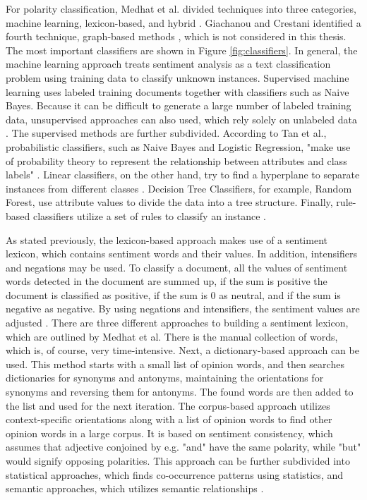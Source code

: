 For polarity classification, Medhat et al. divided techniques into three categories, machine learning, lexicon-based, and hybrid \cite{MEDHAT20141093}. Giachanou and Crestani identified a fourth technique, graph-based methods \cite{DBLP:journals/csur/GiachanouC16}, which is not considered in this thesis. The most important classifiers are shown in Figure \ref{fig:classifiers}. In general, the machine learning approach treats sentiment analysis as a text classification problem using training data to classify unknown instances. Supervised machine learning uses labeled training documents together with classifiers such as Naive Bayes. Because it can be difficult to generate a large number of labeled training data, unsupervised approaches can also used, which rely solely on unlabeled data \cite{MEDHAT20141093}. The supervised methods are further subdivided. According to Tan et al., probabilistic classifiers, such as Naive Bayes and Logistic Regression, "make use of probability theory to represent the relationship between attributes and class labels" \cite[p.~414]{DBLP:books/aw/TanSKK2019}. Linear classifiers, on the other hand, try to find a hyperplane to separate instances from different classes \cite{MEDHAT20141093}. Decision Tree Classifiers, for example, Random Forest, use attribute values to divide the data into a tree structure. Finally, rule-based classifiers utilize a set of rules to classify an instance \cite{DBLP:books/aw/TanSKK2019}.

As stated previously, the lexicon-based approach makes use of a sentiment lexicon, which contains sentiment words and their values. In addition, intensifiers and negations may be used. To classify a document, all the values of sentiment words detected in the document are summed up, if the sum is positive the document is classified as positive, if the sum is 0 as neutral, and if the sum is negative as negative. By using negations and intensifiers, the sentiment values are adjusted \cite{liu_2015}. There are three different approaches to building a sentiment lexicon, which are outlined by Medhat et al. There is the manual collection of words, which is, of course, very time-intensive. Next, a dictionary-based approach can be used. This method starts with a small list of opinion words, and then searches dictionaries for synonyms and antonyms, maintaining the orientations for synonyms and reversing them for antonyms. The found words are then added to the list and used for the next iteration. The corpus-based approach utilizes context-specific orientations along with a list of opinion words to find other opinion words in a large corpus. It is based on sentiment consistency, which assumes that adjective conjoined by e.g. "and" have the same polarity, while "but" would signify opposing polarities. This approach can be further subdivided into statistical approaches, which finds co-occurrence patterns using statistics, and semantic approaches, which utilizes semantic relationships \cite{MEDHAT20141093}.


